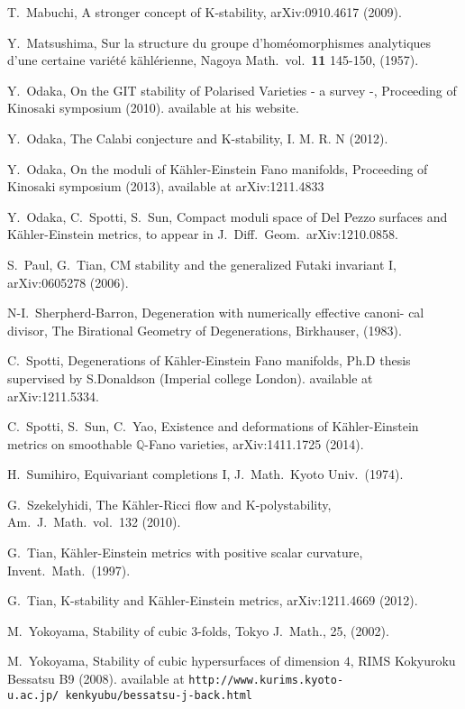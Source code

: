 \documentclass[12pt]{amsart}
\theoremstyle{remark}
\theoremstyle{definition}
\begin{document}
\begin{thebibliography}{FGA}
T.~Mabuchi, 
A stronger concept of K-stability, 
arXiv:0910.4617 (2009). 

Y.~Matsushima, 
Sur la structure du groupe d'hom\'{e}omorphismes analytiques d'une certaine 
vari\'{e}t\'{e} k\"{a}hl\'{e}rienne, 
Nagoya Math.\ vol.\ \textbf{11} 145-150, (1957). 

Y.~Odaka, 
On the GIT stability of Polarised Varieties - a survey -, 
Proceeding of Kinosaki symposium (2010). available at his website. 

Y.~Odaka, 
The Calabi conjecture and K-stability, 
I. M. R. N (2012). 

Y.~Odaka, On the moduli of K\"{a}hler-Einstein Fano manifolds, 
Proceeding of Kinosaki symposium (2013), available at arXiv:1211.4833

Y.~Odaka, C.~Spotti, S.~Sun, 
Compact moduli space of Del Pezzo surfaces and K\"ahler-Einstein metrics, 
to appear in J.\ Diff.\ Geom.\ arXiv:1210.0858. 

S.~Paul, G.~Tian, 
CM stability and the generalized Futaki invariant I, 
arXiv:0605278 (2006). 

N-I.~Sherpherd-Barron, 
Degeneration with numerically effective canoni-
cal divisor, The Birational Geometry of Degenerations, Birkhauser, (1983). 

C.~Spotti, Degenerations of K\"ahler-Einstein Fano manifolds, Ph.D thesis 
supervised by S.Donaldson (Imperial college London). available at arXiv:1211.5334. 

C.~Spotti, S.~Sun, C.~Yao, 
Existence and deformations of K\"{a}hler-Einstein metrics on smoothable 
$\mathbb{Q}$-Fano varieties, arXiv:1411.1725 (2014). 

H.~Sumihiro, 
Equivariant completions I, 
J.\ Math.\ Kyoto Univ.\ (1974). 

G.~Szekelyhidi, 
The K\"ahler-Ricci flow and K-polystability, 
Am.\ J.\ Math.\ vol.\ 132 (2010). 

G.~Tian, 
K\"ahler-Einstein metrics with positive scalar curvature, 
Invent.\ Math.\ (1997). 

G.~Tian, 
K-stability and K\"ahler-Einstein metrics, 
arXiv:1211.4669 (2012). 

M.~Yokoyama, 
Stability of cubic $3$-folds, 
Tokyo J.\ Math., 25, (2002). 

M.~Yokoyama, 
Stability of cubic hypersurfaces of dimension $4$, 
RIMS Kokyuroku Bessatsu B9 (2008). available at 
\texttt{http://www.kurims.kyoto-u.ac.jp/~kenkyubu/bessatsu-j-back.html}

\end{thebibliography}
\end{document}
